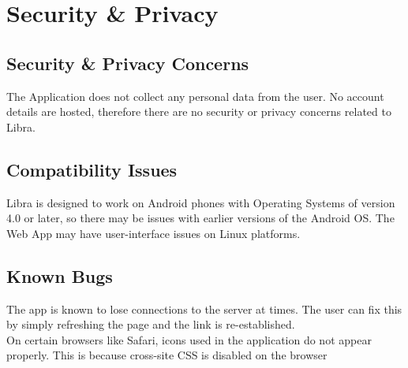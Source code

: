 \chapter{Security \& Privacy}

\section{Security \& Privacy Concerns}

The Application does not collect any personal data from the user. No account details are hosted, therefore there are no security or privacy concerns related to Libra.


\section{Compatibility Issues}

Libra is designed to work on Android phones with Operating Systems of version 4.0 or later, so there may be issues with earlier versions of the Android OS. The Web App may have user-interface issues on Linux platforms.

\section{Known Bugs}

The app is known to lose connections to the server at times. The user can fix this by simply refreshing the page and the link is re-established.\\
On certain browsers like Safari, icons used in the application do not appear properly. This is because cross-site CSS is disabled on the browser 
